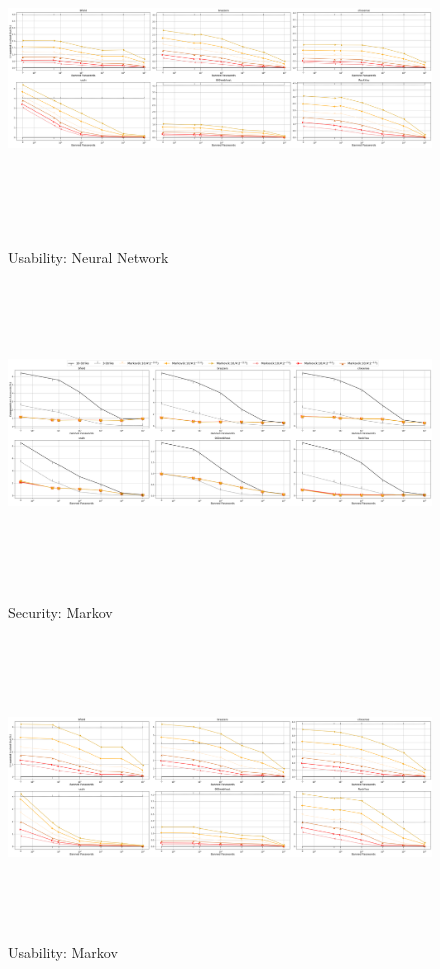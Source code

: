 \begin{figure}

	\includegraphics[width=\linewidth, height = 8cm]{Figures/Experiments/Utility/UsabilityNeuralNet}
	\vspace{-0.2in}
	\caption[Usability: Neural Network Estimator]{Usability: Neural Network}
	\label{fig:usabilityneuralnet}

	\includegraphics[width=\linewidth, height = 8cm]{Figures/Experiments/Attacker/SecurityMarkov}
	\vspace{-0.2in}
	\caption[Security: Markov Estimator]{Security: Markov}
	\label{fig:securitymarkov}
		\includegraphics[width=\linewidth, height = 8cm]{Figures/Experiments/Utility/UsabilityMarkov}
	\vspace{-0.2in}
	\caption[Usability: Neural Network Estimator]{Usability: Markov}
	\label{fig:usabilitymarkov}
\end{figure}


